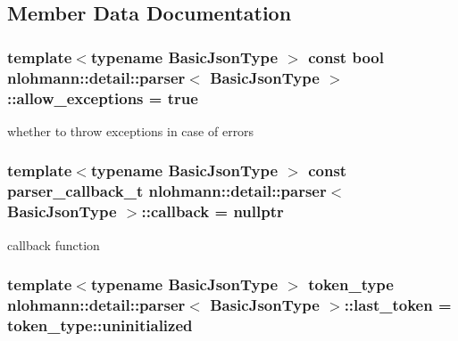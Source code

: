 \subsection{Member Data Documentation}
\subsubsection[{\texorpdfstring{allow\+\_\+exceptions}{allow_exceptions}}]{\setlength{\rightskip}{0pt plus 5cm}template$<$typename Basic\+Json\+Type $>$ const bool {\bf nlohmann\+::detail\+::parser}$<$ Basic\+Json\+Type $>$\+::allow\+\_\+exceptions = true\hspace{0.3cm}{\ttfamily [private]}}\hypertarget{classnlohmann_1_1detail_1_1parser_a3de1ea054cfa606e79fa07741f081b5f}{}\label{classnlohmann_1_1detail_1_1parser_a3de1ea054cfa606e79fa07741f081b5f}


whether to throw exceptions in case of errors 

\subsubsection[{\texorpdfstring{callback}{callback}}]{\setlength{\rightskip}{0pt plus 5cm}template$<$typename Basic\+Json\+Type $>$ const {\bf parser\+\_\+callback\+\_\+t} {\bf nlohmann\+::detail\+::parser}$<$ Basic\+Json\+Type $>$\+::callback = nullptr\hspace{0.3cm}{\ttfamily [private]}}\hypertarget{classnlohmann_1_1detail_1_1parser_a7600d272ec605e3ffdc8512b3585f476}{}\label{classnlohmann_1_1detail_1_1parser_a7600d272ec605e3ffdc8512b3585f476}


callback function 

\subsubsection[{\texorpdfstring{last\+\_\+token}{last_token}}]{\setlength{\rightskip}{0pt plus 5cm}template$<$typename Basic\+Json\+Type $>$ {\bf token\+\_\+type} {\bf nlohmann\+::detail\+::parser}$<$ Basic\+Json\+Type $>$\+::last\+\_\+token = token\+\_\+type\+::uninitialized\hspace{0.3cm}{\ttfamily [private]}}\hypertarget{classnlohmann_1_1detail_1_1parser_a932e49f6f4d291557846744319245994}{}\label{classnlohmann_1_1detail_1_1parser_a932e49f6f4d291557846744319245994}


